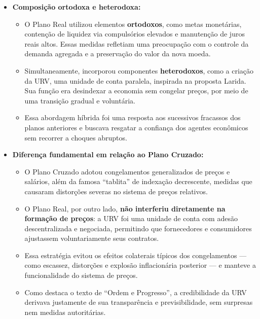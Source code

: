 \documentclass[a4paper,12pt]{article}[abntex2]
\begin{document}
\begin{itemize}

    \item \textbf{Composição ortodoxa e heterodoxa:}
    \begin{itemize}
        \item O Plano Real utilizou elementos \textbf{ortodoxos}, como metas monetárias, contenção de liquidez via compulsórios elevados e manutenção de juros reais altos. Essas medidas refletiam uma preocupação com o controle da demanda agregada e a preservação do valor da nova moeda.
        \item Simultaneamente, incorporou componentes \textbf{heterodoxos}, como a criação da URV, uma unidade de conta paralela, inspirada na proposta Larida. Sua função era desindexar a economia sem congelar preços, por meio de uma transição gradual e voluntária.
        \item Essa abordagem híbrida foi uma resposta aos sucessivos fracassos dos planos anteriores e buscava resgatar a confiança dos agentes econômicos sem recorrer a choques abruptos.
    \end{itemize}

    \item \textbf{Diferença fundamental em relação ao Plano Cruzado:}
    \begin{itemize}
        \item O Plano Cruzado adotou congelamentos generalizados de preços e salários, além da famosa ``tablita'' de indexação decrescente, medidas que causaram distorções severas no sistema de preços relativos.
        \item O Plano Real, por outro lado, \textbf{não interferiu diretamente na formação de preços}: a URV foi uma unidade de conta com adesão descentralizada e negociada, permitindo que fornecedores e consumidores ajustassem voluntariamente seus contratos.
        \item Essa estratégia evitou os efeitos colaterais típicos dos congelamentos — como escassez, distorções e explosão inflacionária posterior — e manteve a funcionalidade do sistema de preços.
        \item Como destaca o texto de “Ordem e Progresso”, a credibilidade da URV derivava justamente de sua transparência e previsibilidade, sem surpresas nem medidas autoritárias.
    \end{itemize}


\end{itemize}
\end{document}
